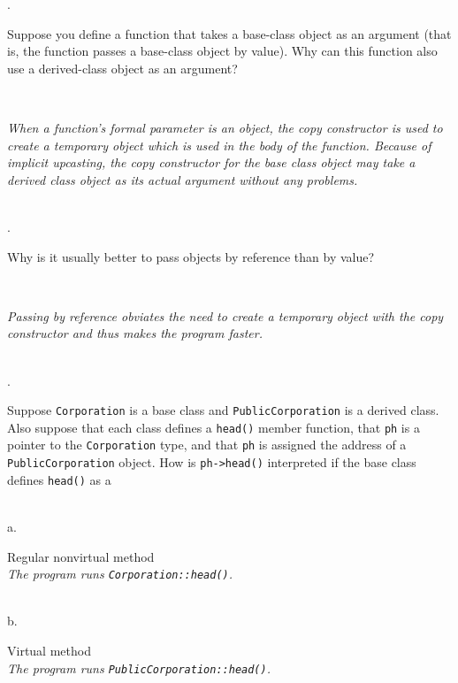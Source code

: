 \documentclass{amsart}
\begin{document}
. 
\begin{minipage}[t]{11.5 cm}
	Suppose you define a function that takes a base-class object as an argument (that is, the function passes a base-class object by value). Why can this function also use a derived-class object as an argument?
\end{minipage} \\[1ex]
\phantom{3. } 
\begin{minipage}[t]{11.5 cm}
	{\slshape 
	When a function's formal parameter is an object, the copy constructor
	is used to create a temporary object which is used in the body
	of the function. 
	Because of implicit upcasting, the copy constructor for the
	base class object may take a derived class object as its actual
	argument without any problems. 
	} 
\end{minipage} 
\\[2ex]

. 
\begin{minipage}[t]{11.5 cm}
	Why is it usually better to pass objects by reference than by value?
\end{minipage} \\[1ex]
\phantom{3. } 
\begin{minipage}[t]{11.5 cm}
	{\slshape 
	Passing by reference obviates the need to create a temporary
	object with the copy constructor and thus makes the program faster.
	} 
\end{minipage} 
\\[2ex]

. 
\begin{minipage}[t]{11.5 cm}
	Suppose \texttt{Corporation} is a base class and \texttt{PublicCorporation} is a derived class. Also suppose that each class defines a \texttt{head()} member function, that \texttt{ph} is a pointer to the \texttt{Corporation} type, and that \texttt{ph} is assigned the address of a \texttt{PublicCorporation} object. How is \verb+ph->head()+ interpreted if the base class defines \texttt{head()} as a 
\end{minipage} \\[1ex]
\phantom{1. }a.
\begin{minipage}[t]{11.5 cm}
	Regular nonvirtual method \\[1ex]
	{\slshape 
	The program runs \verb+Corporation::head()+.
	}  \\
	{} %
\end{minipage} \\[1ex]
\phantom{1. }b.
\begin{minipage}[t]{11.5 cm}
	Virtual method \\[1ex]
	{\slshape 
	The program runs \verb+PublicCorporation::head()+.
	} \\
	{} %
\end{minipage}
\\[2ex]
\end{document}
